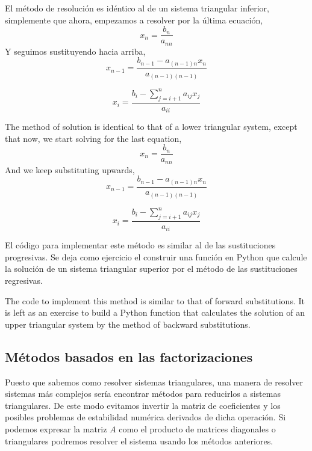 \begin{paracol}{2}
    El método de resolución es idéntico al de un sistema triangular inferior, simplemente que ahora, empezamos a resolver por la última ecuación,
\begin{equation*}
x_n=\frac{b_n}{a_{nn}}
\end{equation*}
Y seguimos sustituyendo hacia arriba,
\begin{equation*}
x_{n-1}=\frac{b_{n-1}-a_{(n-1)n}x_{n}}{a_{(n-1)(n-1)}}
\end{equation*}

\begin{equation*}
x_i=\frac{b_i-\sum_{j=i+1}^{n}a_{ij}x_j}{a_{ii}}
\end{equation*}

\switchcolumn
  The method of solution is identical to that of a lower triangular system, except that now, we start solving for the last equation,
\begin{equation*}
x_n=\frac{b_n}{a_{nn}}
\end{equation*}
And we keep substituting upwards,
\begin{equation*}
x_{n-1}=\frac{b_{n-1}-a_{(n-1)n}x_{n}}{a_{(n-1)(n-1)}}
\end{equation*}

\begin{equation*}
x_i=\frac{b_i-\sum_{j=i+1}^{n}a_{ij}x_j}{a_{ii}}
\end{equation*}

\switchcolumn

El código para implementar este método es similar al de las sustituciones progresivas. Se deja como ejercicio el construir una función en Python que calcule la solución de un sistema triangular superior por el método de las sustituciones regresivas.

\switchcolumn
The code to implement this method is similar to that of forward substitutions. It is left as an exercise to build a Python function that calculates the solution of an upper triangular system by the method of backward substitutions.
\switchcolumn
\subsection{Métodos basados en las factorizaciones}
Puesto que sabemos como resolver sistemas triangulares, una manera de resolver sistemas más complejos sería encontrar métodos para reducirlos a sistemas triangulares. De este modo evitamos invertir la matriz de coeficientes y los posibles problemas de estabilidad numérica derivados de dicha operación. Si podemos expresar la matriz $A$ como el producto de matrices diagonales o triangulares podremos resolver el sistema usando los métodos anteriores. 


\end{paracol}

